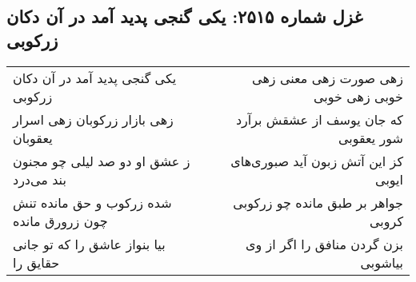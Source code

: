\begin{center}
\section*{غزل شماره ۲۵۱۵: یکی گنجی پدید آمد در آن دکان زرکوبی}
\label{sec:2515}
\begin{longtable}{l p{0.5cm} r}
یکی گنجی پدید آمد در آن دکان زرکوبی
&&
زهی صورت زهی معنی زهی خوبی زهی خوبی
\\
زهی بازار زرکوبان زهی اسرار یعقوبان
&&
که جان یوسف از عشقش برآرد شور یعقوبی
\\
ز عشق او دو صد لیلی چو مجنون بند می‌درد
&&
کز این آتش زبون آید صبوری‌های ایوبی
\\
شده زرکوب و حق مانده تنش چون زرورق مانده
&&
جواهر بر طبق مانده چو زرکوبی کروبی
\\
بیا بنواز عاشق را که تو جانی حقایق را
&&
بزن گردن منافق را اگر از وی بیاشوبی
\\
\end{longtable}
\end{center}
